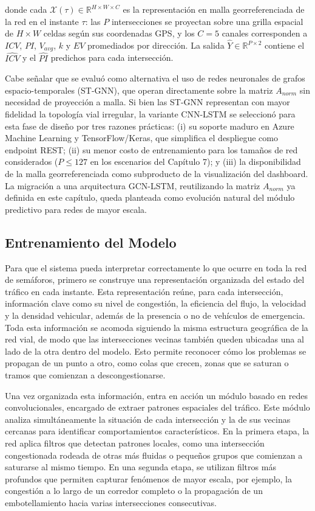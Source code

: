 \documentclass[12pt,a4paper,oneside]{report}
\begin{document}
donde cada \(\mathcal{X}(\tau) \in \mathbb{R}^{H \times W \times C}\) es la representación en malla georreferenciada de la red en el instante \(\tau\): las \(P\) intersecciones se proyectan sobre una grilla espacial de \(H \times W\) celdas según sus coordenadas GPS, y los \(C = 5\) canales corresponden a \(ICV\), \(PI\), \(V_{avg}\), \(k\) y \(EV\) promediados por dirección. La salida \(\widehat{Y} \in \mathbb{R}^{P \times 2}\) contiene el \(\widehat{ICV}\) y el \(\widehat{PI}\) predichos para cada intersección.

Cabe señalar que se evaluó como alternativa el uso de redes neuronales de grafos espacio-temporales (ST-GNN), que operan directamente sobre la matriz \(A_{norm}\) sin necesidad de proyección a malla. Si bien las ST-GNN representan con mayor fidelidad la topología vial irregular, la variante CNN-LSTM se seleccionó para esta fase de diseño por tres razones prácticas: (i) su soporte maduro en Azure Machine Learning y TensorFlow/Keras, que simplifica el despliegue como endpoint REST; (ii) su menor costo de entrenamiento para los tamaños de red considerados (\(P \leq 127\) en los escenarios del Capítulo 7); y (iii) la disponibilidad de la malla georreferenciada como subproducto de la visualización del dashboard. La migración a una arquitectura GCN-LSTM, reutilizando la matriz \(A_{norm}\) ya definida en este capítulo, queda planteada como evolución natural del módulo predictivo para redes de mayor escala.

\subsection{Entrenamiento del Modelo}\label{entrenamiento-del-modelo}

Para que el sistema pueda interpretar correctamente lo que ocurre en toda la red de semáforos, primero se construye una representación organizada del estado del tráfico en cada instante. Esta representación reúne, para cada intersección, información clave como su nivel de congestión, la eficiencia del flujo, la velocidad y la densidad vehicular, además de la presencia o no de vehículos de emergencia. Toda esta información se acomoda siguiendo la misma estructura geográfica de la red vial, de modo que las intersecciones vecinas también queden ubicadas una al lado de la otra dentro del modelo. Esto permite reconocer cómo los problemas se propagan de un punto a otro, como colas que crecen, zonas que se saturan o tramos que comienzan a descongestionarse.

Una vez organizada esta información, entra en acción un módulo basado en redes convolucionales, encargado de extraer patrones espaciales del tráfico. Este módulo analiza simultáneamente la situación de cada intersección y la de sus vecinas cercanas para identificar comportamientos característicos. En la primera etapa, la red aplica filtros que detectan patrones locales, como una intersección congestionada rodeada de otras más fluidas o pequeños grupos que comienzan a saturarse al mismo tiempo. En una segunda etapa, se utilizan filtros más profundos que permiten capturar fenómenos de mayor escala, por ejemplo, la congestión a lo largo de un corredor completo o la propagación de un embotellamiento hacia varias intersecciones consecutivas.
\end{document}
